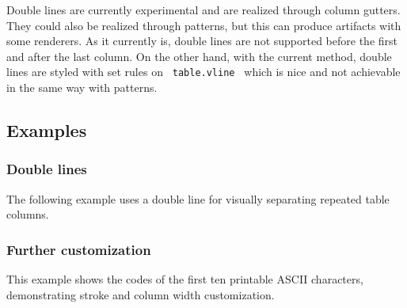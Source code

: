 Double lines are currently experimental and are realized through column
gutters. They could also be realized through patterns, but this can
produce artifacts with some renderers. As it currently is, double lines
are not supported before the first and after the last column. On the
other hand, with the current method, double lines are styled with set
rules on \texttt{\ table.vline\ } which is nice and not achievable in
the same way with patterns.

\subsection{Examples}\label{examples}

\subsubsection{Double lines}\label{double-lines}

The following example uses a double line for visually separating
repeated table columns.

\begin{Shaded}
\begin{Highlighting}[]
  
\NormalTok{  [1], [34.3], [11.1],  [6], [34.0], [12.9],}
\NormalTok{  [2], [34.2], [11.2],  [7], [34.3], [12.8],}
\NormalTok{  [3], [34.6], [11.4],  [8], [33.9], [11.9],}
\NormalTok{  [4], [34.7], [10.3],  [9], [34.4], [11.8],}
\NormalTok{  [5], [34.3], [11.1], [10], [34.4], [11.8],}
\NormalTok{)}
\end{Highlighting}
\end{Shaded}


\subsubsection{Further customization}\label{further-customization}

This example shows the codes of the first ten printable ASCII
characters, demonstrating stroke and column width customization.

